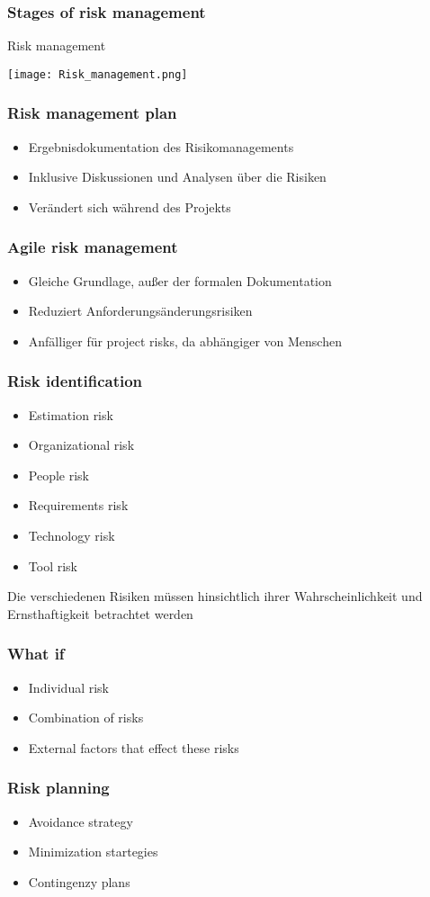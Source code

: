 \subsubsection{Stages of risk management}
\begin{table}[H]
\caption{Risk management}
\texttt{[image: Risk\_management.png]}	
\end{table}
\subsubsection{Risk management plan}
\begin{itemize}
	\item Ergebnisdokumentation des Risikomanagements
	\item Inklusive Diskussionen und Analysen über die Risiken
	\item Verändert sich während des Projekts
\end{itemize}
\subsubsection{Agile risk management}
\begin{itemize}
	\item Gleiche Grundlage, außer der formalen Dokumentation
	\item Reduziert Anforderungsänderungsrisiken
	\item Anfälliger für project risks, da abhängiger von Menschen  
\end{itemize}
\subsubsection{Risk identification}
\begin{itemize}
	\item Estimation risk
	\item Organizational risk
	\item People risk
	\item Requirements risk
	\item Technology risk
	\item Tool risk
\end{itemize}
Die verschiedenen Risiken müssen hinsichtlich ihrer Wahrscheinlichkeit und Ernsthaftigkeit betrachtet werden
\subsubsection{What if}
\begin{itemize}
	\item Individual risk
	\item Combination of risks
	\item External factors that effect these risks
\end{itemize}
\subsubsection{Risk planning}
\begin{itemize}
	\item Avoidance strategy
	\item Minimization startegies
	\item Contingenzy plans
\end{itemize}



